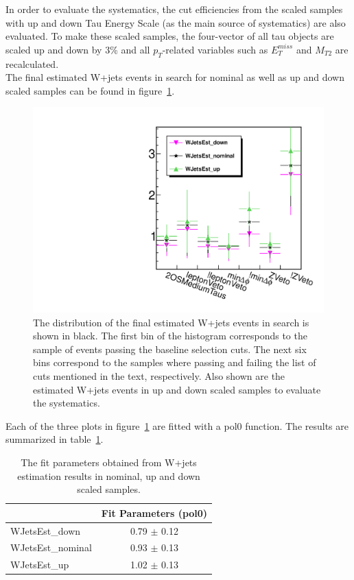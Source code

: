 In order to evaluate the systematics, the cut efficiencies from the scaled samples with 
up and down Tau Energy Scale (as the main source of systematics) are also evaluated.
To make these scaled samples, the four-vector of all tau objects 
are scaled up and down by 3\% and all $p_T$-related variables such as $E_T^{miss}$ 
and $M_{T2}$ are recalculated.\\
The final estimated W+jets events in search \binone for nominal as well as up and down scaled samples 
can be found in figure~\ref{fig:wjets_1}.  
\begin{figure}[iHhtb]
\centering
\includegraphics[angle=0,scale=0.35]{TauTauFigs/WJets_bin1.pdf}
\caption{The distribution of the final estimated W+jets events in search \binone is shown in black. 
 The first bin of the histogram corresponds to the sample of events passing the baseline selection cuts. 
The next six bins correspond to the samples where passing and failing the 
list of cuts mentioned in the text, respectively. Also shown are the estimated W+jets events in up and down scaled samples to evaluate the systematics.}
\label{fig:wjets_1}
\end{figure}

Each of the three plots in figure~\ref{fig:wjets_1} are fitted with a pol0 function. The results are summarized in table~\ref{tbl:fitpars}.
\begin{table}
\begin{center}
\begin{tabular}{lc}
\hline\hline
  & Fit Parameters (pol0) \\
\hline\hline
WJetsEst\_down & 0.79 $\pm$ 0.12 \\
WJetsEst\_nominal & 0.93 $\pm$ 0.13 \\
WJetsEst\_up & 1.02 $\pm$ 0.13 \\
\hline\hline
\end{tabular}
\caption{The fit parameters obtained from W+jets estimation results in nominal, up and down scaled samples.}
\label{tbl:fitpars}
\end{center}
\end{table}

